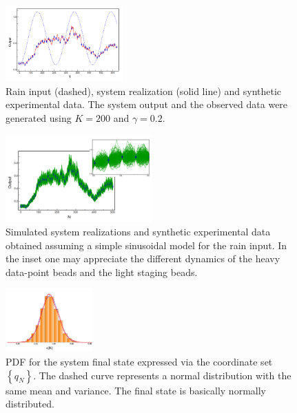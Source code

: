 \documentclass[12pt,a4paper,final]{iopart}
\begin{document}
\begin{figure}[htb!]
    \centering
    \includegraphics[width=0.4\textwidth]{Figs/FigRainData.png}
    \caption{\label{fig:rain_data_S}Rain input (dashed), system realization (solid line) and synthetic experimental data. The system output and the observed data were generated using $K=200$ and $\gamma = 0.2$.}
\end{figure}

\begin{figure}[htb!]
    \centering
    \includegraphics[width=0.5\textwidth]{Figs/FigSpaghetti.png}
    \caption{Simulated system realizations and synthetic experimental data obtained assuming a simple sinusoidal model for the rain input. In the inset one may appreciate the different dynamics of the heavy data-point beads and the light staging beads.}
    \label{fig:spaghetti}
\end{figure}

\begin{figure}[htb!]
    \centering
    \includegraphics[width=0.3\textwidth]{Figs/FigFinalState.png}
    \caption{PDF for the system final state expressed via the coordinate set $\left\{ q_N \right\}$. The dashed curve represents a normal distribution with the same mean and variance. The final state is basically normally distributed.}
    \label{fig:final_state}
\end{figure}
\end{document}
